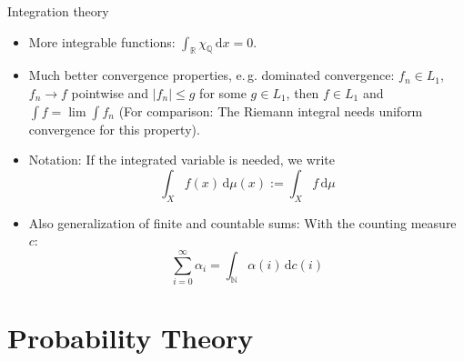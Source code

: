 \documentclass[compress]{beamer}
\newcommand{\RR}{\mathbb{R}}
\newcommand{\QQ}{\mathbb{Q}}
\newcommand{\NN}{\mathbb{N}}
\newcommand{\td}{\,\mathrm{d}}  %
\begin{document}
\begin{frame}{Integration theory}
  \begin{itemize}
  \item More integrable functions: $\int_\RR \chi_\QQ \td x= 0$.
  \item Much better convergence properties, e.\,g. dominated convergence: $f_n
    \in L_1$, $f_n \to f$ pointwise and $|f_n|\leq g$ for some $g \in L_1$, then
    $f \in L_1$ and $\int f = \lim \int f_n$ (For comparison: The Riemann
    integral needs uniform convergence for this property).
  \item Notation: If the integrated variable is needed, we write
   \[
     \int_X f(x) \td \mu(x) := \int_X f\td \mu
   \]
 \item Also generalization of finite and countable sums: With the counting
   measure $c$:
    \[ \sum_{i=0}^\infty \alpha_i = \int_\NN \alpha(i) \td c(i) \]
  \end{itemize}
\end{frame}


\section{Probability Theory}
\end{document}
